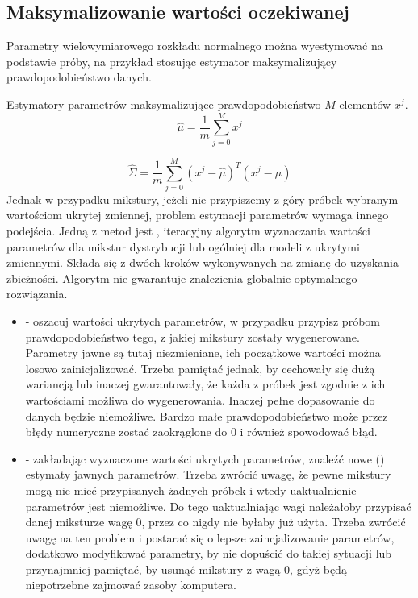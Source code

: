 \subsection{Maksymalizowanie wartości oczekiwanej}\label{sec:expectation_maximization}

Parametry wielowymiarowego rozkładu normalnego można wyestymować na podstawie próby, na przykład
stosując estymator maksymalizujący prawdopodobieństwo danych.

Estymatory parametrów maksymalizujące prawdopodobieństwo $M$ elementów $x^j$.
$$\hat{\mu} = \frac{1}{m} \sum_{j=0}^M x^{j}$$

$$\hat{\Sigma} = \frac{1}{m} \sum_{j=0}^M (x^{j} - \hat{\mu})^T (x^{j} - \hat{\mu})$$
Jednak w przypadku mikstury, jeżeli nie przypiszemy z góry próbek wybranym wartościom ukrytej zmiennej, problem
estymacji parametrów wymaga innego podejścia. Jedną z metod jest , iteracyjny
algorytm wyznaczania wartości parametrów dla mikstur dystrybucji lub ogólniej dla modeli z ukrytymi zmiennymi.
Składa się z dwóch kroków wykonywanych na zmianę do uzyskania zbieżności.  Algorytm nie gwarantuje znalezienia
globalnie optymalnego rozwiązania.

\begin{itemize}
    \item {} - oszacuj wartości ukrytych parametrów, w przypadku  przypisz próbom
        prawdopodobieństwo tego, z jakiej mikstury zostały wygenerowane. Parametry jawne są tutaj niezmieniane,
        ich początkowe wartości można losowo zainicjalizować. Trzeba pamiętać jednak, by cechowały się dużą wariancją
        lub inaczej gwarantowały, że każda z próbek jest zgodnie z ich wartościami możliwa do wygenerowania. Inaczej
        pełne dopasowanie do danych będzie niemożliwe. Bardzo małe prawdopodobieństwo może przez błędy numeryczne
        zostać zaokrąglone do $0$ i również spowodować błąd.
    \item {} - zakładając wyznaczone wartości ukrytych parametrów, znaleźć nowe 
        () estymaty
        jawnych parametrów. Trzeba zwrócić uwagę, że pewne mikstury mogą nie mieć przypisanych żadnych próbek
        i wtedy uaktualnienie parametrów jest niemożliwe. Do tego uaktualniając wagi  należałoby
        przypisać danej miksturze wagę $0$, przez co nigdy nie byłaby już użyta. Trzeba zwrócić uwagę na ten problem
        i postarać się o lepsze zaincjalizowanie parametrów, dodatkowo modyfikować parametry, by nie dopuścić
        do takiej sytuacji lub przynajmniej pamiętać, by usunąć mikstury z wagą $0$, gdyż będą niepotrzebne zajmować
        zasoby komputera.
\end{itemize}

